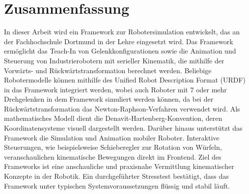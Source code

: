 \section*{Zusammenfassung}
In dieser Arbeit wird ein Framework zur Robotersimulation entwickelt, das an der Fachhochschule Dortmund in der Lehre eingesetzt wird.  
Das Framework ermöglicht das Teach-In von Gelenkkonfigurationen sowie die Animation und Steuerung von Industrierobotern mit serieller Kinematik,
die mithilfe der Vorwärts- und Rück\-wärts\-trans\-for\-ma\-tion berechnet werden.  
Beliebige Robotermodelle können mithilfe des Unified Robot Description Format (URDF) in das Framework integriert werden,
wobei auch Roboter mit 7 oder mehr Drehgelenken in dem Framework simuliert werden können,
da bei der Rückwärtstransformation das Newton-Raphson-Verfahren verwendet wird.
Als mathematisches Modell dient die Denavit-Hartenberg-Konvention, deren Koordinatensysteme visuell dargestellt werden.  
Darüber hinaus unterstützt das Framework die Simulation und Animation mobiler Roboter.  
Interaktive Steuerungen, wie beispielsweise Schieberegler zur Rotation von Würfeln, veranschaulichen kinematische Bewegungen direkt im Frontend.  
Ziel des Frameworks ist eine anschauliche und praxisnahe Vermittlung kinematischer Konzepte in der Robotik.  
Ein durchgeführter Stresstest bestätigt, dass das Framework unter typischen Systemvoraussetzungen flüssig und stabil läuft.


